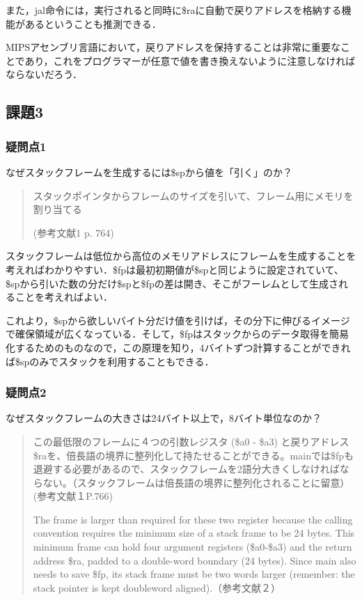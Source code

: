 \documentclass[a4j]{jarticle}
\begin{document}
また，jal命令には，実行されると同時に\$raに自動で戻りアドレスを格納する機能があるということも推測できる．

MIPSアセンブリ言語において，戻りアドレスを保持することは非常に重要なことであり，これをプログラマーが任意で値を書き換えないように注意しなければならないだろう．




\subsection{課題3}

\subsubsection{疑問点1}

なぜスタックフレームを生成するには\$spから値を「引く」のか？

\begin{quote}
スタックポインタからフレームのサイズを引いて、フレーム用にメモリを割り当てる 

(参考文献1 p. 764)
\end{quote}

スタックフレームは低位から高位のメモリアドレスにフレームを生成することを考えればわかりやすい．\$fpは最初初期値が\$spと同じように設定されていて、\$spから引いた数の分だけ\$spと\$fpの差は開き、そこがフーレムとして生成されることを考えればよい．

これより，\$spから欲しいバイト分だけ値を引けば，その分下に伸びるイメージで確保領域が広くなっている．そして，\$fpはスタックからのデータ取得を簡易化するためのものなので，この原理を知り，4バイトずつ計算することができれば\$spのみでスタックを利用することもできる．

\subsubsection{疑問点2}

なぜスタックフレームの大きさは24バイト以上で，8バイト単位なのか？  

\begin{quote}
この最低限のフレームに４つの引数レジスタ (\$a0 - \$a3) と戻りアドレス\$raを、倍長語の境界に整列化して持たせることができる。mainでは\$fpも退避する必要があるので、スタックフレームを2語分大きくしなければならない。（スタックフレームは倍長語の境界に整列化されることに留意）(参考文献１P.766)

The frame is larger than required for these two register because the calling convention requires the minimum size of a stack frame to be 24 bytes. This minimum frame can hold four argument registers (\$a0-\$a3) and the return address \$ra, padded to a double-word boundary (24 bytes). Since main also needs to save \$fp, its stack frame must be two words larger (remember: the stack pointer is kept doubleword aligned).（参考文献２）
\end{quote}
\end{document}
